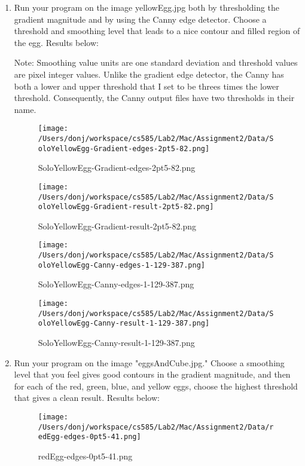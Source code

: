 \documentclass{article}
\begin{document}
\begin{enumerate}

\item
Run your program on the image yellowEgg.jpg both by thresholding the gradient magnitude and by using the Canny edge detector. Choose a threshold and smoothing level that leads to a nice contour and filled region of the egg. Results below:

Note: Smoothing value units are one standard deviation and threshold values are pixel integer values. Unlike the gradient edge detector, the Canny has both a lower and upper threshold that I set to be threes times the lower threshold. Consequently, the Canny output files have two thresholds in their name.

\begin{figure}[!htbp]
\centering
\texttt{[image: /Users/donj/workspace/cs585/Lab2/Mac/Assignment2/Data/SoloYellowEgg-Gradient-edges-2pt5-82.png]}
\caption{SoloYellowEgg-Gradient-edges-2pt5-82.png}
\label{overflow}
\end{figure}

\begin{figure}[H]
\centering
\texttt{[image: /Users/donj/workspace/cs585/Lab2/Mac/Assignment2/Data/SoloYellowEgg-Gradient-result-2pt5-82.png]}
\caption{SoloYellowEgg-Gradient-result-2pt5-82.png}
\label{overflow}
\end{figure}

\begin{figure}[H]
\centering
\texttt{[image: /Users/donj/workspace/cs585/Lab2/Mac/Assignment2/Data/SoloYellowEgg-Canny-edges-1-129-387.png]}
\caption{SoloYellowEgg-Canny-edges-1-129-387.png}
\label{overflow}
\end{figure}

\begin{figure}[H]
\centering
\texttt{[image: /Users/donj/workspace/cs585/Lab2/Mac/Assignment2/Data/SoloYellowEgg-Canny-result-1-129-387.png]}
\caption{SoloYellowEgg-Canny-result-1-129-387.png}
\label{overflow}
\end{figure}

\item
Run your program on the image "eggsAndCube.jpg." Choose a smoothing level that you feel gives good contours in the gradient magnitude, and then for each of the red, green, blue, and yellow eggs, choose the highest threshold that gives a clean result. Results below:

\begin{figure}[H]
\centering
\texttt{[image: /Users/donj/workspace/cs585/Lab2/Mac/Assignment2/Data/redEgg-edges-0pt5-41.png]}
\caption{redEgg-edges-0pt5-41.png}
\label{overflow}
\end{figure}


\end{enumerate}
\end{document}
